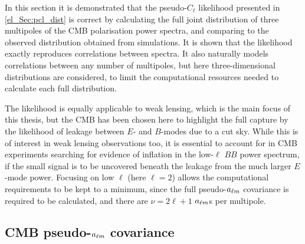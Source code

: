 In this section it is demonstrated that the pseudo-$C_\ell$ likelihood presented in \autoref{el_Sec:pcl_dist} is correct by calculating the full joint distribution of three multipoles of the CMB polarisation power spectra, and comparing to the observed distribution obtained from simulations. It is shown that the likelihood exactly reproduces correlations between spectra. It also naturally models correlations between any number of multipoles, but here three-dimensional distributions are considered, to limit the computational resources needed to calculate each full distribution.

The likelihood is equally applicable to weak lensing, which is the main focus of this thesis, but the CMB has been chosen here to highlight the full capture by the likelihood of leakage between $E$- and $B$-modes due to a cut sky. While this is of interest in weak lensing observations too, it is essential to account for in CMB experiments searching for evidence of inflation in the low-$\ell$ $BB$ power spectrum, if the small signal is to be uncovered beneath the leakage from the much larger $E$-mode power. Focusing on low $\ell$ (here $\ell = 2$) allows the computational requirements to be kept to a minimum, since the full pseudo-$a_{\ell m}$ covariance is required to be calculated, and there are $\nu = 2 \ell + 1$ $a_{\ell m}$s per multipole.

\subsection{CMB pseudo-\texorpdfstring{$a_{\ell m}$}{alm} covariance}
\label{el_Sec:CMB_alm_covariance}

